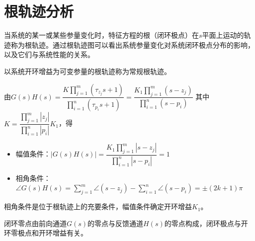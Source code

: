 \documentclass[11pt,a4paper]{ctexart}
\begin{document}
\section{根轨迹分析}
    当系统的某一或某些参量变化时，特征方程的根（闭环极点）在$s$平面上运动的轨迹称为根轨迹。通过根轨迹图可以看出系统参量变化对系统闭环极点分布的影响，以及它们与系统性能的关系。

    以系统开环增益为可变参量的根轨迹称为常规根轨迹。
    
    由$G(s)H(s)=\dfrac{K\prod\limits_{j=1}^m(\tau_{z_j}s+1)}{\prod\limits_{i=1}^n(\tau_{p_i}s+1)}=\dfrac{K_1\prod\limits_{j=1}^m(s-z_j)}{\prod\limits_{i=1}^n(s-p_i)}$
    其中$K=\dfrac{\prod\limits_{j=1}^m|z_j|}{\prod\limits_{i=1}^n|p_i|}K_1$，得

    \begin{itemize}
        \item 幅值条件：$|G(s)H(s)|=\dfrac{K_1\prod\limits_{j=1}^m|s-z_j|}{\prod\limits_{i=1}^n|s-p_i|}=1$
        \item 相角条件：$\angle G(s)H(s)=\sum\limits_{j=1}^m\angle (s-z_j)-\sum\limits_{i=1}^n\angle(s-p_i)=\pm(2k+1)\pi$
    \end{itemize}

    相角条件是位于根轨迹上的充要条件，幅值条件确定开环增益$K_1$。

    闭环零点由前向通道$G(s)$的零点与反馈通道$H(s)$的零点构成，闭环极点与开环零极点和开环增益有关。
\end{document}
